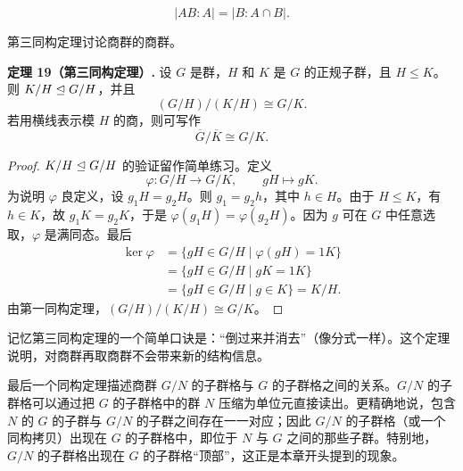 \begin{center}
\end{center}
\[
  |AB:A|=|B:A\cap B|.
\]

第三同构定理讨论商群的商群。

\medskip
\noindent\textbf{定理 19（第三同构定理）.} 设 $G$ 是群，$H$ 和 $K$ 是 $G$ 的正规子群，且 $H\leq K$。则 $K/H\trianglelefteq G/H$，并且
\[
  (G/H)/(K/H)\cong G/K.
\]
若用横线表示模 $H$ 的商，则可写作
\[
  \overline G/\overline K\cong G/K.
\]

\begin{proof}
$K/H\trianglelefteq G/H$ 的验证留作简单练习。定义
\[
  \varphi:G/H\to G/K,
  \qquad gH\mapsto gK.
\]
为说明 $\varphi$ 良定义，设 $g_1H=g_2H$。则 $g_1=g_2h$，其中 $h\in H$。由于 $H\leq K$，有 $h\in K$，故 $g_1K=g_2K$，于是 $\varphi(g_1H)=\varphi(g_2H)$。因为 $g$ 可在 $G$ 中任意选取，$\varphi$ 是满同态。最后
\begin{align*}
  \ker\varphi
  &=\{gH\in G/H\mid \varphi(gH)=1K\}\\
  &=\{gH\in G/H\mid gK=1K\}\\
  &=\{gH\in G/H\mid g\in K\}=K/H.
\end{align*}
由第一同构定理，$(G/H)/(K/H)\cong G/K$。
\end{proof}

记忆第三同构定理的一个简单口诀是：“倒过来并消去”（像分式一样）。这个定理说明，对商群再取商群不会带来新的结构信息。

最后一个同构定理描述商群 $G/N$ 的子群格与 $G$ 的子群格之间的关系。$G/N$ 的子群格可以通过把 $G$ 的子群格中的群 $N$ 压缩为单位元直接读出。更精确地说，包含 $N$ 的 $G$ 的子群与 $G/N$ 的子群之间存在一一对应；因此 $G/N$ 的子群格（或一个同构拷贝）出现在 $G$ 的子群格中，即位于 $N$ 与 $G$ 之间的那些子群。特别地，$G/N$ 的子群格出现在 $G$ 的子群格“顶部”，这正是本章开头提到的现象。

